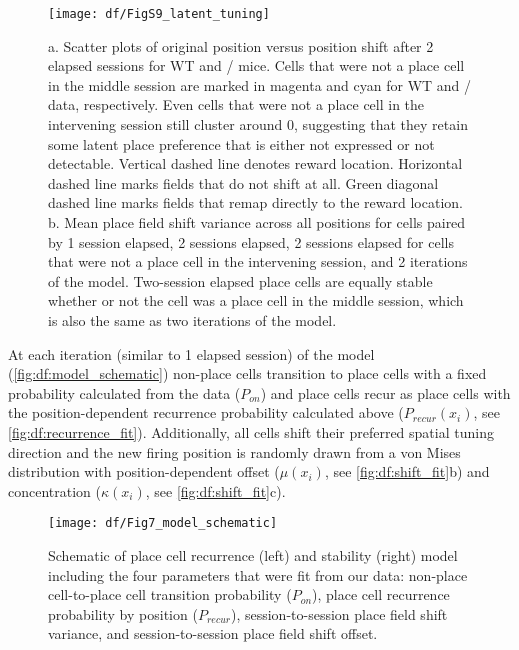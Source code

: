 \begin{figure}
	\centering
	\texttt{[image: df/FigS9\_latent\_tuning]}
	\caption[Latent spatial tuning revealed across multiple sessions]{a. Scatter plots of original position versus position shift after 2 elapsed sessions for WT and \df/ mice. Cells that were not a place cell in the middle session are marked in magenta and cyan for WT and \df/ data, respectively. Even cells that were not a place cell in the intervening session still cluster around 0, suggesting that they retain some latent place preference that is either not expressed or not detectable. Vertical dashed line denotes reward location. Horizontal dashed line marks fields that do not shift at all. Green diagonal dashed line marks fields that remap directly to the reward location.
	b. Mean place field shift variance across all positions for cells paired by 1 session elapsed, 2 sessions elapsed, 2 sessions elapsed for cells that were not a place cell in the intervening session, and 2 iterations of the model. Two-session elapsed place cells are equally stable whether or not the cell was a place cell in the middle session, which is also the same as two iterations of the model.}
	\label{fig:df:latent_tuning}
\end{figure}

At each iteration (similar to 1 elapsed session) of the model (\autoref{fig:df:model_schematic}) non-place cells transition to place cells with a fixed probability calculated from the data ($P_{on}$) and place cells recur as place cells with the position-dependent recurrence probability calculated above ($P_{recur}(x_i)$, see \autoref{fig:df:recurrence_fit}). Additionally, all cells shift their preferred spatial tuning direction and the new firing position is randomly drawn from a von Mises distribution with position-dependent offset ($\mu(x_i)$, see \autoref{fig:df:shift_fit}b) and concentration ($\kappa(x_i)$, see \autoref{fig:df:shift_fit}c).

\begin{figure}
	\centering
	\texttt{[image: df/Fig7\_model\_schematic]}
	\caption[Place cell recurrence model schematic]{Schematic of place cell recurrence (left) and stability (right) model including the four parameters that were fit from our data: non-place cell-to-place cell transition probability ($P_{on}$), place cell recurrence probability by position ($P_{recur}$), session-to-session place field shift variance, and session-to-session place field shift offset.}
	\label{fig:df:model_schematic}
\end{figure}

